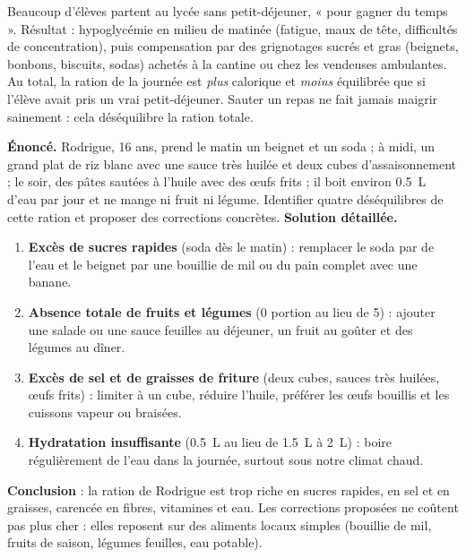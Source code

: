 \documentclass[11pt]{article}
\begin{document}
\begin{attention}
Beaucoup d'élèves partent au lycée sans petit-déjeuner, « pour gagner du temps ». Résultat : hypoglycémie en milieu de matinée (fatigue, maux de tête, difficultés de concentration), puis compensation par des grignotages sucrés et gras (beignets, bonbons, biscuits, sodas) achetés à la cantine ou chez les vendeuses ambulantes. Au total, la ration de la journée est \emph{plus} calorique et \emph{moins} équilibrée que si l'élève avait pris un vrai petit-déjeuner. Sauter un repas ne fait jamais maigrir sainement : cela déséquilibre la ration totale.
\end{attention}

\begin{exoresolu}
\textbf{Énoncé.} Rodrigue, 16 ans, prend le matin un beignet et un soda ; à midi, un grand plat de riz blanc avec une sauce très huilée et deux cubes d'assaisonnement ; le soir, des pâtes sautées à l'huile avec des œufs frits ; il boit environ \SI{0,5}{\liter} d'eau par jour et ne mange ni fruit ni légume. Identifier quatre déséquilibres de cette ration et proposer des corrections concrètes.
\tcblower
\textbf{Solution détaillée.}
\begin{enumerate}
\item \textbf{Excès de sucres rapides} (soda dès le matin) : remplacer le soda par de l'eau et le beignet par une bouillie de mil ou du pain complet avec une banane.
\item \textbf{Absence totale de fruits et légumes} (0 portion au lieu de 5) : ajouter une salade ou une sauce feuilles au déjeuner, un fruit au goûter et des légumes au dîner.
\item \textbf{Excès de sel et de graisses de friture} (deux cubes, sauces très huilées, œufs frits) : limiter à un cube, réduire l'huile, préférer les œufs bouillis et les cuissons vapeur ou braisées.
\item \textbf{Hydratation insuffisante} (\SI{0,5}{\liter} au lieu de \SI{1,5}{\liter} à \SI{2}{\liter}) : boire régulièrement de l'eau dans la journée, surtout sous notre climat chaud.
\end{enumerate}
\textbf{Conclusion} : la ration de Rodrigue est trop riche en sucres rapides, en sel et en graisses, carencée en fibres, vitamines et eau. Les corrections proposées ne coûtent pas plus cher : elles reposent sur des aliments locaux simples (bouillie de mil, fruits de saison, légumes feuilles, eau potable).
\end{exoresolu}
\end{document}
